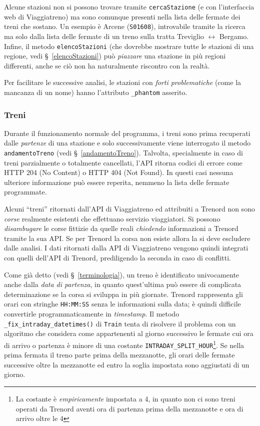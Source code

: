 \documentclass[12pt,a4paper,italian]{report}
\begin{document}
Alcune stazioni non si possono trovare tramite \texttt{cercaStazione}
(e con l'interfaccia web di Viaggiatreno) ma sono comunque presenti
nella lista delle fermate dei treni che sostano.  Un esempio è Arcene
(\texttt{S01608}), introvabile tramite la ricerca ma solo dalla lista
delle fermate di un treno sulla tratta Treviglio $\leftrightarrow$
Bergamo.  Infine, il metodo \texttt{elencoStazioni} (che dovrebbe
mostrare tutte le stazioni di una regione, vedi
\S~\ref{elencoStazioni}) può \textit{piazzare} una stazione in più
regioni differenti, anche se ciò non ha naturalmente riscontro con la
realtà.

Per facilitare le successive analisi, le stazioni con \textit{forti
    problematiche} (come la mancanza di un nome) hanno l'attributo
\texttt{\_phantom} asserito.

\subsubsection{Treni}

Durante il funzionamento normale del programma, i treni sono prima
recuperati dalle \textit{partenze} di una stazione e solo
successivamente viene interrogato il metodo \texttt{andamentoTreno}
(vedi \S~\ref{andamentoTreno}).  Talvolta, specialmente in caso di
treni parzialmente o totalmente cancellati, l'API ritorna codici di
errore come HTTP 204 (No Content) o HTTP 404 (Not Found).  In questi
casi nessuna ulteriore informazione può essere reperita, nemmeno la
lista delle fermate programmate.

Alcuni ``treni'' ritornati dall'API di Viaggiatreno ed attribuiti a
Trenord non sono \textit{corse} realmente esistenti che effettuano
servizio viaggiatori.  Si possono \textit{disambugare} le corse
fittizie da quelle reali \textit{chiedendo} informazioni a Trenord
tramite la sua API\@.  Se per Trenord la corsa non esiste allora la si
deve escludere dalle analisi.  I dati ritornati dalla API di
Viaggiatreno vengono quindi integrati con quelli dell'API di Trenord,
prediligendo la seconda in caso di conflitti.

Come già detto (vedi \S~\ref{terminologia}), un treno è identificato
univocamente anche dalla \textit{data di partenza}, in quanto
quest'ultima può essere di complicata determinazione se la corsa si
sviluppa in più giornate.  Trenord rappresenta gli orari con stringhe
\texttt{HH:MM:SS} senza le informazioni sulla data; è quindi difficile
convertirle programmaticamente in \textit{timestamp}.  Il metodo
\texttt{\_fix\_intraday\_datetimes()} di \texttt{Train} tenta di
risolvere il problema con un algoritmo che considera come appartenenti
al giorno successivo le fermate cui ora di arrivo o partenza è minore
di una costante \texttt{INTRADAY\_\-SPLIT\_\-HOUR}\footnote{La
    costante è \textit{empiricamente} impostata a 4, in quanto non ci
    sono treni operati da Trenord aventi ora di partenza prima della
    mezzanotte e ora di arrivo oltre le 4}.  Se nella prima fermata il
treno parte prima della mezzanotte, gli orari delle fermate successive
oltre la mezzanotte ed entro la soglia impostata sono aggiustati di un
giorno.
\end{document}
